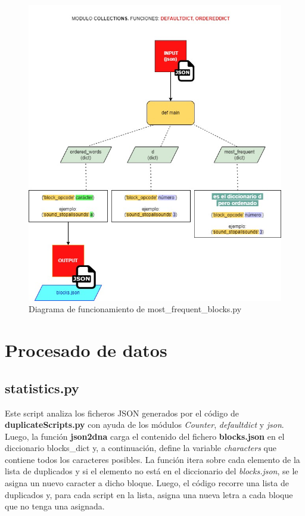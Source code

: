 \documentclass[a4paper, 12pt]{book}
\begin{document}
\begin{figure}[!htb]
  \centering
  \includegraphics[width=15cm, keepaspectratio]{img/flow_mostfreq.jpg}
  \caption{Diagrama de funcionamiento de most\_frequent\_blocks.py}
  \label{fig:flow_mostfreq}
\end{figure}

\newpage 

\section{Procesado de datos} 
\label{sec:procesadodatos}

\subsection{statistics.py}

Este script analiza los ficheros JSON generados por el código de \textbf{duplicateScripts.py} con ayuda de los módulos \textit{Counter}, \textit{defaultdict} y \textit{json}. Luego, la función \textbf{json2dna} carga el contenido del fichero \textbf{blocks.json} en el diccionario blocks\_dict y, a continuación, define la variable \textit{characters} que contiene todos los caracteres posibles. La función itera sobre cada elemento de la lista de duplicados y si el elemento no está en el diccionario del \textit{blocks.json}, se le asigna un nuevo caracter a dicho bloque. Luego, el código recorre una lista de duplicados y, para cada script en la lista, asigna una nueva letra a cada bloque que no tenga una asignada.
\end{document}
